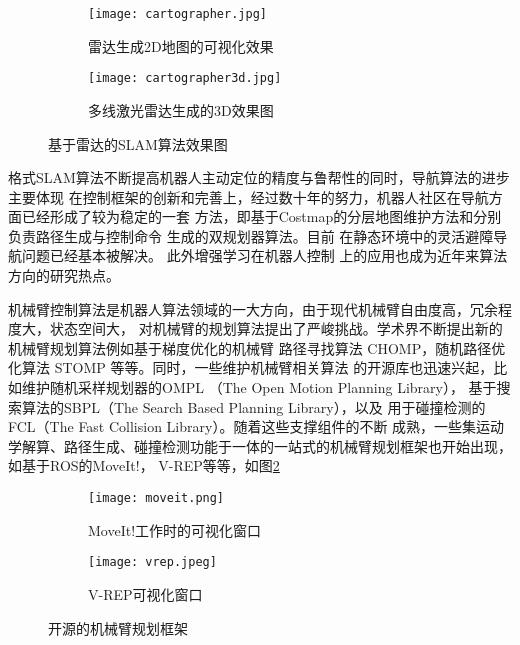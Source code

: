 \begin{figure}
\centering
\begin{subfigure}{.6\textwidth}
  \centering
  \texttt{[image: cartographer.jpg]}
  \caption{雷达生成2D地图的可视化效果}
\end{subfigure}%
\begin{subfigure}{.4\textwidth}
  \centering
  \texttt{[image: cartographer3d.jpg]}
  \caption{多线激光雷达生成的3D效果图}
\end{subfigure}
\caption{基于雷达的SLAM算法效果图}
\label{fig:lidar_slams}
\end{figure}


格式SLAM算法不断提高机器人主动定位的精度与鲁帮性的同时，导航算法的进步主要体现
在控制框架的创新和完善上，经过数十年的努力，机器人社区在导航方面已经形成了较为稳定的一套
方法，即基于Costmap的分层地图维护方法\cite{lu2014layered}和分别负责路径生成与控制命令
生成的双规划器算法\cite{guimaraes2016ros}。目前
在静态环境中的灵活避障导航问题已经基本被解决\cite{Zhou2017A}。 此外增强学习在机器人控制
上的应用也成为近年来算法方向的研究热点\cite{schaal2002learning}。

机械臂控制算法是机器人算法领域的一大方向，由于现代机械臂自由度高，冗余程度大，状态空间大，
对机械臂的规划算法提出了严峻挑战。学术界不断提出新的机械臂规划算法例如基于梯度优化的机械臂
路径寻找算法 CHOMP\cite{ratliff2009chomp}，随机路径优化算法 STOMP\cite{kalakrishnan2011stomp}
等等。同时，一些维护机械臂相关算法 的开源库也迅速兴起，比如维护随机采样规划器的OMPL
（The Open Motion Planning Library）\cite{sucan2010open}，
基于搜索算法的SBPL（The Search Based Planning Library）\cite{likhachev2014sbpl}，以及
用于碰撞检测的FCL（The Fast Collision Library）\cite{pan2012fcl}。随着这些支撑组件的不断
成熟，一些集运动学解算、路径生成、碰撞检测功能于一体的一站式的机械臂规划框架也开始出现，
如基于ROS的MoveIt!\cite{chitta2012moveit}， V-REP等等，如图\ref{fig:moveit_vrep}

\begin{figure}
\centering
\begin{subfigure}{.6\textwidth}
  \centering
  \texttt{[image: moveit.png]}
  \caption{MoveIt!工作时的可视化窗口}
\end{subfigure}%
\begin{subfigure}{.4\textwidth}
  \centering
  \texttt{[image: vrep.jpeg]}
  \caption{V-REP可视化窗口}
\end{subfigure}
\caption{开源的机械臂规划框架}
\label{fig:moveit_vrep}
\end{figure}


